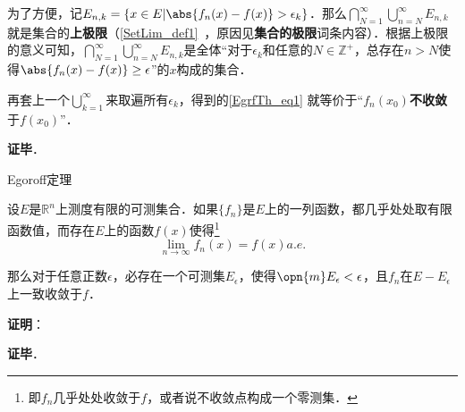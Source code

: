 为了方便，记$E_{n, k}=\{x\in E|\abs{f_n(x)-f(x)}>\epsilon_k\}$．那么$\bigcap^\infty_{N=1}\bigcup^\infty_{n=N} E_{n, k}$就是集合的\textbf{上极限}（\autoref{SetLim_def1}~，原因见\textbf{集合的极限}词条内容）．根据上极限的意义可知，$\bigcap^\infty_{N=1}\bigcup^\infty_{n=N} E_{n, k}$是全体“对于$\epsilon_k$和任意的$N\in\mathbb{Z}^+$，总存在$n>N$使得$\abs{f_n(x)-f(x)}\geq\epsilon$”的$x$构成的集合．

再套上一个$\bigcup^\infty_{k=1}$来取遍所有$\epsilon_k$，得到的\autoref{EgrfTh_eq1} 就等价于“$f_n(x_0)$\textbf{不收敛}于$f(x_0)$”．

\textbf{证毕}．








\begin{theorem}{Egoroff定理}

设$E$是$\mathbb{R}^n$上测度有限的可测集合．如果$\{f_n\}$是$E$上的一列函数，都几乎处处取有限函数值，而存在$E$上的函数$f(x)$使得\footnote{即$f_n$几乎处处收敛于$f$，或者说不收敛点构成一个零测集．}\begin{equation}
\lim\limits_{n\to\infty}f_n(x)=f(x)a. e. 
\end{equation}

那么对于任意正数$\epsilon$，必存在一个可测集$E_\epsilon$，使得$\opn{m}E_\epsilon<\epsilon$，且$f_n$在$E-E_\epsilon$上一致收敛于$f$．

\end{theorem}

\textbf{证明}：



\textbf{证毕}．










